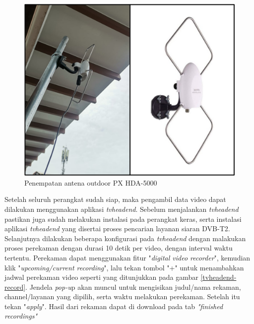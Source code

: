 \begin{figure}[H]
	\vspace{-0.1cm}
	\begin{center}
		\includegraphics[width=0.6\columnwidth]{bab4/Gambar/antenna-5000.png}
	\end{center}
	\vspace{-0.2cm}
	\caption{Penempatan antena outdoor PX HDA-5000}
	\label{antenna-5000}
\end{figure}

Setelah seluruh perangkat sudah siap, maka pengambil data video dapat dilakukan menggunakan aplikasi \textit{tvheadend}. Sebelum menjalankan \textit{tvheadend} pastikan juga sudah melakukan instalasi pada perangkat keras, serta instalasi aplikasi \textit{tvheadend} yang disertai proses pencarian layanan siaran DVB-T2. Selanjutnya dilakukan beberapa konfigurasi pada \textit{tvheadend} dengan malakukan proses perekaman dengan durasi 10 detik per video, dengan interval waktu tertentu. Perekaman dapat menggunakan fitur "\textit{digital video recorder}", kemudian klik  "\textit{upcoming/current recording}", lalu tekan tombol "+" untuk menambahkan jadwal perekaman video seperti yang ditunjukkan pada gambar \ref{tvheadend-record}. Jendela \textit{pop-u}p akan muncul untuk mengisikan judul/nama rekaman, channel/layanan yang dipilih, serta waktu melakukan perekaman. Setelah itu tekan "\textit{apply}". Hasil dari rekaman dapat di download pada tab \textit{"finished recordings"}


